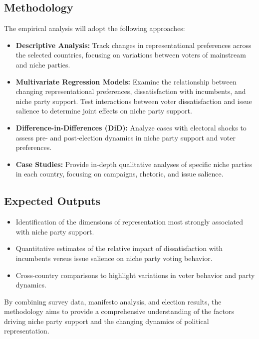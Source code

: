 \subsection*{Methodology}
The empirical analysis will adopt the following approaches:
\begin{itemize}
	\item \textbf{Descriptive Analysis:}
	      Track changes in representational preferences across the selected countries, focusing on variations between voters of mainstream and niche parties.

	\item \textbf{Multivariate Regression Models:}
	      Examine the relationship between changing representational preferences, dissatisfaction with incumbents, and niche party support. Test interactions between voter dissatisfaction and issue salience to determine joint effects on niche party support.

	\item \textbf{Difference-in-Differences (DiD):}
	      Analyze cases with electoral shocks to assess pre- and post-election dynamics in niche party support and voter preferences.

	\item \textbf{Case Studies:}
	      Provide in-depth qualitative analyses of specific niche parties in each country, focusing on campaigns, rhetoric, and issue salience.
\end{itemize}

\subsection*{Expected Outputs}
\begin{itemize}
	\item Identification of the dimensions of representation most strongly associated with niche party support.
	\item Quantitative estimates of the relative impact of dissatisfaction with incumbents versus issue salience on niche party voting behavior.
	\item Cross-country comparisons to highlight variations in voter behavior and party dynamics.
\end{itemize}

By combining survey data, manifesto analysis, and election results, the methodology aims to provide a comprehensive understanding of the factors driving niche party support and the changing dynamics of political representation.

